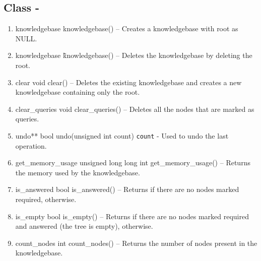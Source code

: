 \subsection{Class - \knowledgebase}
\begin{enumerate}
\item \begin{detail}
{knowledgebase}
{knowledgebase()}
{--}
{Creates a knowledgebase with root as NULL.} 
\end{detail}
\item \begin{detail}
{knowledgebase}
{\~knowledgebase()}
{--}
{Deletes the knowledgebase by deleting the root.} 
\end{detail}
\item \begin{detail}
{clear}
{void clear()}
{--}
{Deletes the existing knowledgebase and creates a new knowledgebase containing only the root.} 
\end{detail}
\item \begin{detail}
{clear\_queries}
{void clear\_queries()}
{--}
{Deletes all the nodes that are marked as queries.} 
\end{detail}
\item \begin{detail}
{undo**}
{bool undo(unsigned int count)}
{\texttt{count} - }
{Used to undo the last operation.} 
\end{detail}
\item \begin{detail}
{get\_memory\_usage}
{unsigned long long int get\_memory\_usage()}
{--}
{Returns the memory used by the knowledgebase.} 
\end{detail}
\item \begin{detail}
{is\_answered}
{bool is\_answered()}
{--}
{Returns \true if there are no nodes marked required, \false otherwise.} 
\end{detail}
\item \begin{detail}
{is\_empty}
{bool is\_empty()}
{--}
{Returns \true if there are no nodes marked required and answered (the tree is empty), \false otherwise.} 
\end{detail}
\item \begin{detail}
{count\_nodes}
{int count\_nodes()}
{--}
{Returns the number of nodes present in the knowledgebase.} 

\end{detail}
\end{enumerate}
